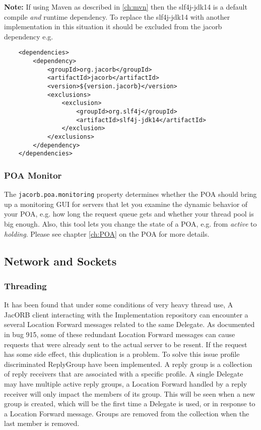 \textbf{Note:} If using Maven as described in \ref{ch:mvn} then the slf4j-jdk14
is a default compile \textit{and} runtime dependency. To replace the slf4j-jdk14
with another implementation in this situation it should be excluded from the
jacorb dependency e.g.
\begin{verbatim}
    <dependencies>
        <dependency>
            <groupId>org.jacorb</groupId>
            <artifactId>jacorb</artifactId>
            <version>${version.jacorb}</version>
            <exclusions>
                <exclusion>
                    <groupId>org.slf4j</groupId>
                    <artifactId>slf4j-jdk14</artifactId>
                </exclusion>
            </exclusions>
        </dependency>
    </dependencies>
\end{verbatim}

\subsubsection{POA Monitor}

The  {\tt jacorb.poa.monitoring} property  determines whether  the POA
should bring up a monitoring GUI  for servers that let you examine the
dynamic behavior of  your POA, e.g.  how long  the request queue gets
and whether your thread pool is  big enough.  Also, this tool lets you
change the  state of a POA,  e.g. from {\it active}  to {\it holding}.
Please see chapter \ref{ch:POA} on the POA for more details.

\subsection{Network and Sockets}

\subsubsection{Threading}
It has been found that under some conditions of very heavy thread use, A JacORB
client interacting with the Implementation repository can encounter a several
Location Forward messages related to the same Delegate. As documented in bug
915, some of these redundant Location Forward messages can cause requests that
were already sent to the actual server to be resent. If the request has some
side effect, this duplication is a problem. To solve this issue profile
discriminated ReplyGroup have been implemented. A reply group is a collection of
reply receivers that are associated with a specific profile. A single Delegate
may have multiple active reply groups, a Location Forward handled by a reply
receiver will only impact the members of its group. This will be seen when a new
group is created, which will be the first time a Delegate is used, or in
response to a Location Forward message. Groups are removed from the collection
when the last member is removed.

